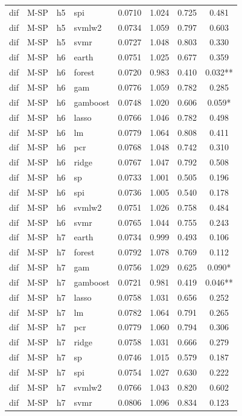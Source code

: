 \begin{ThreePartTable}
\begin{longtable}[t]{llclcccc}
dif & M-SP & h5 & spi & 0.0710 & 1.024 & 0.725 & 0.481\\
dif & M-SP & h5 & svmlw2 & 0.0734 & 1.059 & 0.797 & 0.603\\
dif & M-SP & h5 & svmr & 0.0727 & 1.048 & 0.803 & 0.330\\
\addlinespace
dif & M-SP & h6 & earth & 0.0751 & 1.025 & 0.677 & 0.359\\
dif & M-SP & h6 & forest & 0.0720 & 0.983 & 0.410 & 0.032**\\
dif & M-SP & h6 & gam & 0.0776 & 1.059 & 0.782 & 0.285\\
dif & M-SP & h6 & gamboost & 0.0748 & 1.020 & 0.606 & 0.059*\\
dif & M-SP & h6 & lasso & 0.0766 & 1.046 & 0.782 & 0.498\\
dif & M-SP & h6 & lm & 0.0779 & 1.064 & 0.808 & 0.411\\
dif & M-SP & h6 & pcr & 0.0768 & 1.048 & 0.742 & 0.310\\
dif & M-SP & h6 & ridge & 0.0767 & 1.047 & 0.792 & 0.508\\
dif & M-SP & h6 & sp & 0.0733 & 1.001 & 0.505 & 0.196\\
dif & M-SP & h6 & spi & 0.0736 & 1.005 & 0.540 & 0.178\\
dif & M-SP & h6 & svmlw2 & 0.0751 & 1.026 & 0.758 & 0.484\\
dif & M-SP & h6 & svmr & 0.0765 & 1.044 & 0.755 & 0.243\\
\addlinespace
dif & M-SP & h7 & earth & 0.0734 & 0.999 & 0.493 & 0.106\\
dif & M-SP & h7 & forest & 0.0792 & 1.078 & 0.769 & 0.112\\
dif & M-SP & h7 & gam & 0.0756 & 1.029 & 0.625 & 0.090*\\
dif & M-SP & h7 & gamboost & 0.0721 & 0.981 & 0.419 & 0.046**\\
dif & M-SP & h7 & lasso & 0.0758 & 1.031 & 0.656 & 0.252\\
dif & M-SP & h7 & lm & 0.0782 & 1.064 & 0.791 & 0.265\\
dif & M-SP & h7 & pcr & 0.0779 & 1.060 & 0.794 & 0.306\\
dif & M-SP & h7 & ridge & 0.0758 & 1.031 & 0.666 & 0.279\\
dif & M-SP & h7 & sp & 0.0746 & 1.015 & 0.579 & 0.187\\
dif & M-SP & h7 & spi & 0.0754 & 1.027 & 0.630 & 0.222\\
dif & M-SP & h7 & svmlw2 & 0.0766 & 1.043 & 0.820 & 0.602\\
dif & M-SP & h7 & svmr & 0.0806 & 1.096 & 0.834 & 0.123\\

\end{longtable}
\end{ThreePartTable}
